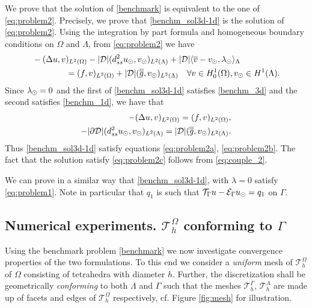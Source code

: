 \documentclass[r]{siamart171218}
\newcommand{\paolo}[1]{{\color{magenta}#1}}
\begin{document}
\paolo{We prove that the solution of \eqref{benchmark} is equivalent to the one of \eqref{eq:problem2}.}
Precisely, we prove that \eqref{benchm_sol3d-1d} is the solution of
\eqref{eq:problem2}. Using the integration by part formula and homogeneous
boundary conditions on $\Omega$ and $\Lambda$, from \eqref{eq:problem2} we have
\begin{align*}
&-(\Delta u, v)_{L^2(\Omega)} - |{\cal D}|(d^2_{ss} \ud, \vd)_{L^2(\Lambda)} 
+ |{\cal D}|\langle \avrc{v}  - \vd, \ld \rangle_\Lambda
\\
\nonumber
&\qquad\qquad= (f,v)_{L^2(\Omega)} + |{\cal D}| (\avrd{g},\vd)_{L^2(\Lambda)}
\quad \forall v \in H^1_0(\Omega), \vd \in H^1(\Lambda).
\end{align*}
Since $\lambda_{\odot}=0$ and the first of \eqref{benchm_sol3d-1d} satisfies \eqref{benchm_3d} and the second satisfies \eqref{benchm_1d}, we have that
\begin{align*}
-(\Delta u, v)_{L^2(\Omega)} =  (f,v)_{L^2(\Omega)}, 
\\
-|{\partial \cal D}|(d^2_{ss} \ud, \vd)_{L^2(\Lambda)}  = |{\cal D}| (\avrd{g},\vd)_{L^2(\Lambda)}.
\end{align*}
Thus \eqref{benchm_sol3d-1d} satisfy equations \eqref{eq:problem2a}, \eqref{eq:problem2b}.
The fact that the solution satisfy \eqref{eq:problem2c} follows from \eqref{eq:couple_2}.

We can prove in a similar way that \eqref{benchm_sol3d-1d}, with $\lambda=0$
satisfy \eqref{eq:problem1}. Note in particular that $q_1$ is such that
${\mathcal{T}_\Gamma}{u} - \mathcal{E}_\Gamma{u_{\odot}} = q_1$ on $\Gamma$.

\subsection{Numerical experiments. $\mathcal{T}^{\Omega}_h$ conforming to $\Gamma$}\label{sec:experiment_conform}
Using the benchmark problem \eqref{benchmark} we now investigate convergence
properties of the two formulations. To this end we consider a \emph{uniform} mesh
of $\mathcal{T}^{\Omega}_h$ of $\Omega$ consisting of tetrahedra with diameter $h$.
Further, the discretization shall be geometrically \emph{conforming} to both $\Lambda$
and $\Gamma$ such that the meshes $\mathcal{T}^{\Gamma}_h$, $\mathcal{T}^{\Lambda}_h$
are made up of facets and edges of $\mathcal{T}^{\Omega}_h$ respectively, cf. Figure \ref{fig:mesh}
for illustration.
\end{document}
